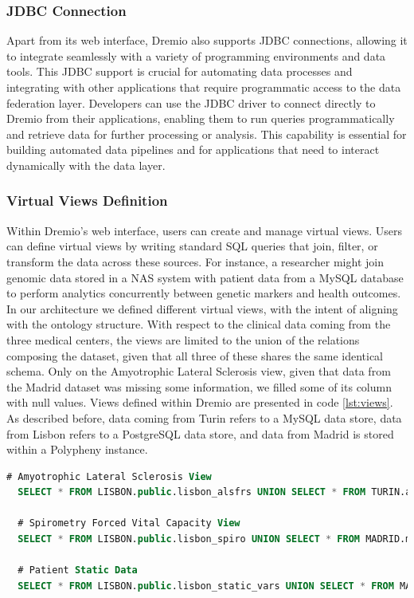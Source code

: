 \subsubsection{JDBC Connection}
Apart from its web interface, Dremio also supports \ac{JDBC} connections, allowing it to integrate seamlessly with a variety of programming environments and data tools. This \ac{JDBC} support is crucial for automating data processes and integrating with other applications that require programmatic access to the data federation layer. Developers can use the \ac{JDBC} driver to connect directly to Dremio from their applications, enabling them to run queries programmatically and retrieve data for further processing or analysis. This capability is essential for building automated data pipelines and for applications that need to interact dynamically with the data layer.
\subsubsection{Virtual Views Definition}
Within Dremio's web interface, users can create and manage virtual views. Users can define virtual views by writing standard \ac{SQL} queries that join, filter, or transform the data across these sources. For instance, a researcher might join genomic data stored in a \ac{NAS} system with patient data from a MySQL database to perform analytics concurrently between genetic markers and health outcomes.
In our architecture we defined different virtual views, with the intent of aligning with the ontology structure. With respect to the clinical data coming from the three medical centers, the views are limited to the union of the relations composing the dataset, given that all three of these shares the same identical schema. Only on the Amyotrophic Lateral Sclerosis view, given that data from the Madrid dataset was missing some information, we filled some of its column with null values.
Views defined within Dremio are presented in code \ref{lst:views}. As described before, data coming from Turin refers to a MySQL data store, data from Lisbon refers to a PostgreSQL data store, and data from Madrid is stored within a Polypheny instance.
\begin{lstlisting}[language=SQL, caption={Virtual views over clinical data}, label={lst:views}]
  # Amyotrophic Lateral Sclerosis View
  SELECT * FROM LISBON.public.lisbon_alsfrs UNION SELECT * FROM TURIN.alsfrs_turin.Turin_alsfrs UNION SELECT MADRID.madrid_alsfrs.patient, MADRID.madrid_alsfrs."date", MADRID.madrid_alsfrs.tot, NULL AS bulbar, NULL AS motor, NULL AS respiratory, NULL AS q1, NULL AS q2, NULL AS q3, NULL AS q4, NULL AS q5, NULL AS q6, NULL AS q7, NULL AS q8, NULL AS q9, NULL AS q10, NULL AS q11, NULL AS q12 FROM MADRID.madrid_alsfrs;

  # Spirometry Forced Vital Capacity View
  SELECT * FROM LISBON.public.lisbon_spiro UNION SELECT * FROM MADRID.madrid_alsfrs.Madrid_spiro UNION SELECT * FROM TURIN.alsfrs_turin.Turin_spiro;

  # Patient Static Data
  SELECT * FROM LISBON.public.lisbon_static_vars UNION SELECT * FROM MADRID.madrid_alsfrs.Madrid_static_vars UNION SELECT * FROM TURIN.alsfrs_turin.Turin_static_vars;
\end{lstlisting}


